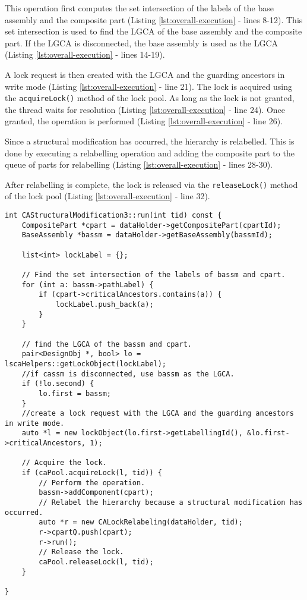 This operation first computes the set intersection of the labels of the base assembly and the composite part (Listing \ref{lst:overall-execution} - lines 8-12). This set intersection is used to find the LGCA of the base assembly and the composite part. If the LGCA is disconnected, the base assembly is used as the LGCA (Listing \ref{lst:overall-execution} - lines 14-19).

A lock request is then created with the LGCA and the guarding ancestors in write mode (Listing \ref{lst:overall-execution} - line 21). The lock is acquired using the \texttt{acquireLock()} method of the lock pool. As long as the lock is not granted, the thread waits for resolution (Listing \ref{lst:overall-execution} - line 24). Once granted, the operation is performed (Listing \ref{lst:overall-execution} - line 26).

Since a structural modification has occurred, the hierarchy is relabelled. This is done by executing a relabelling operation and adding the composite part to the queue of parts for relabelling (Listing \ref{lst:overall-execution} - lines 28-30). 

After relabelling is complete, the lock is released via the \texttt{releaseLock()} method of the lock pool (Listing \ref{lst:overall-execution} - line 32).


\begin{lstlisting}[caption={Overall execution of an operation in CALock}, label={lst:overall-execution}]
int CAStructuralModification3::run(int tid) const {
    CompositePart *cpart = dataHolder->getCompositePart(cpartId);
    BaseAssembly *bassm = dataHolder->getBaseAssembly(bassmId);

    list<int> lockLabel = {};

    // Find the set intersection of the labels of bassm and cpart.
    for (int a: bassm->pathLabel) {
        if (cpart->criticalAncestors.contains(a)) {
            lockLabel.push_back(a);
        }
    }

    // find the LGCA of the bassm and cpart.
    pair<DesignObj *, bool> lo = lscaHelpers::getLockObject(lockLabel);
    //if cassm is disconnected, use bassm as the LGCA.
    if (!lo.second) {
        lo.first = bassm;
    }
    //create a lock request with the LGCA and the guarding ancestors in write mode. 
    auto *l = new lockObject(lo.first->getLabellingId(), &lo.first->criticalAncestors, 1);

    // Acquire the lock.
    if (caPool.acquireLock(l, tid)) {
        // Perform the operation.
        bassm->addComponent(cpart);
        // Relabel the hierarchy because a structural modification has occurred.
        auto *r = new CALockRelabeling(dataHolder, tid);
        r->cpartQ.push(cpart);
        r->run();
        // Release the lock.
        caPool.releaseLock(l, tid);
    }

}

\end{lstlisting}